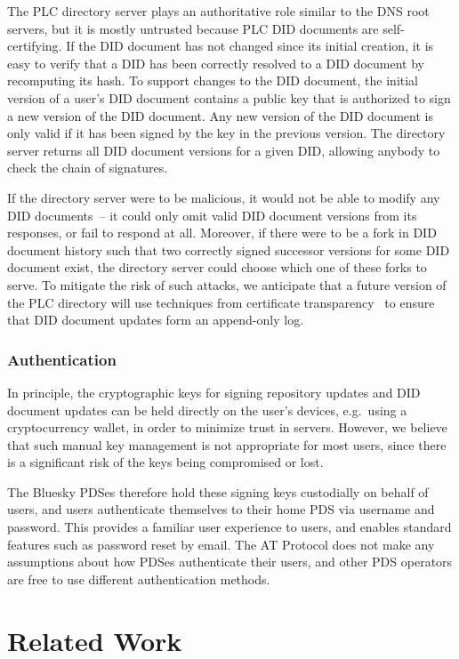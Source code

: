 \documentclass[sigconf,nonacm]{acmart}
\begin{document}
The PLC directory server plays an authoritative role similar to the DNS root servers, but it is mostly untrusted because PLC DID documents are self-certifying.
If the DID document has not changed since its initial creation, it is easy to verify that a DID has been correctly resolved to a DID document by recomputing its hash.
To support changes to the DID document, the initial version of a user's DID document contains a public key that is authorized to sign a new version of the DID document.
Any new version of the DID document is only valid if it has been signed by the key in the previous version.
The directory server returns all DID document versions for a given DID, allowing anybody to check the chain of signatures.

If the directory server were to be malicious, it would not be able to modify any DID documents~-- it could only omit valid DID document versions from its responses, or fail to respond at all.
Moreover, if there were to be a fork in DID document history such that two correctly signed successor versions for some DID document exist, the directory server could choose which one of these forks to serve.
To mitigate the risk of such attacks, we anticipate that a future version of the PLC directory will use techniques from certificate transparency~\cite{Laurie:2014} to ensure that DID document updates form an append-only log.

\subsubsection{Authentication}

In principle, the cryptographic keys for signing repository updates and DID document updates can be held directly on the user's devices, e.g.\ using a cryptocurrency wallet, in order to minimize trust in servers.
However, we believe that such manual key management is not appropriate for most users, since there is a significant risk of the keys being compromised or lost.

The Bluesky PDSes therefore hold these signing keys custodially on behalf of users, and users authenticate themselves to their home PDS via username and password.
This provides a familiar user experience to users, and enables standard features such as password reset by email.
The AT Protocol does not make any assumptions about how PDSes authenticate their users, and other PDS operators are free to use different authentication methods.

\section{Related Work}\label{sec:related-work}
\end{document}
